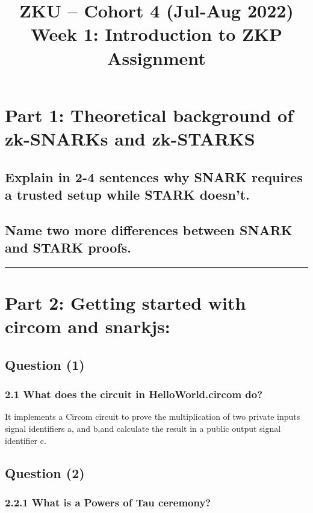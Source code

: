 \documentclass[letterpaper, 10 pt, conference]{ieeeconf}  %
\title{\LARGE \bf
ZKU – Cohort 4 (Jul-Aug 2022)\\Week 1: Introduction to ZKP\\Assignment \sharp 1}
\begin{document}
\maketitle
\thispagestyle{empty}
\pagestyle{empty}


\section{\textbf{Part 1:} Theoretical background of zk-SNARKs and zk-STARKS}
\subsection{\textbf{Explain in 2-4 sentences why SNARK requires a trusted setup while STARK doesn’t.}}

\subsection{\textbf{Name two more differences between SNARK and STARK proofs.}}

\noindent\rule{8cm}{0.4pt}

\section{\textbf{Part 2:} Getting started with circom and snarkjs:}
\subsection{\textbf{Question (1)}}
\subsubsection{\textbf{2.1 What does the circuit in HelloWorld.circom do?}}

It implements a Circom circuit to prove the multiplication of two private inputs signal identifiers a, and b,and calculate the result in a public output signal identifier c. 

\subsection{\textbf{Question (2)}}
\subsubsection{\textbf{2.2.1 What is a Powers of Tau ceremony?}}
\end{document}
